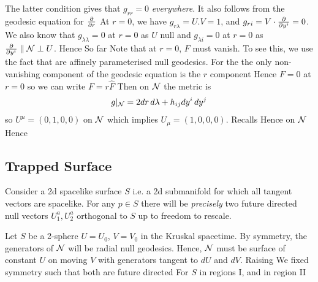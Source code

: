 \documentclass{article}
\begin{document}
The latter condition gives that $g_{rr} = 0 $ \emph{everywhere}. It also follows from the geodesic equation for $\frac{\partial}{\partial r}$ 
At $r=0$, we have $g_{r\lambda} = U.V= 1$, and $g_{ri} = V \cdot \frac{\partial}{\partial y^i} = 0$. We also know that $g_{\lambda\lambda} = 0$ at $r=0$ as $U$ null and $g_{\lambda i} = 0$ at $r=0$ as $\frac{\partial}{\partial y^i} \parallel \mathcal{N} \perp U$. Hence
So far 
Note that at $r=0$, $F$ must vanish. To see this, we use the fact that 
are affinely parameterised null geodesics. For the the only non-vanishing component of the geodesic equation is the $r$ component
Hence $F=0$ at $r=0$ so we can write $F = r \hat{F}$
Then on $\mathcal{N}$ the metric is 
\begin{align}\label{eq:BH:10}
g|_{\mathcal{N}} =  2 dr \, d\lambda + h_{ij} dy^i \, dy^j
\end{align}
so $U^\mu = (0,1,0,0)$ on $\mathcal{N}$ which implies $U_\mu= (1,0,0,0)$. Recalls 
Hence on $\mathcal{N}$
Hence 

\subsection{Trapped Surface}

Consider a 2d spacelike surface $S$ i.e. a 2d submanifold for which all tangent vectors are spacelike. For any $p \in S$ there will be \emph{precisely} two future directed null vectors $U_1^a, U_2^a$ orthogonal to $S$ up to freedom to rescale. 

\begin{example}
Let $S$ be a 2-sphere $U=U_0$, $V=V_0$ in the Kruskal spacetime. By symmetry, the generators of $\mathcal{N}$ will be radial null geodesics. Hence, $\mathcal{N}$ must be surface of constant $U$ on moving $V$ with generators tangent to $dU$
 and $dV$. Raising 
We fixed symmetry such that both are future directed  
For $S$ in regions I, 
and in region II
\end{example}
\end{document}
